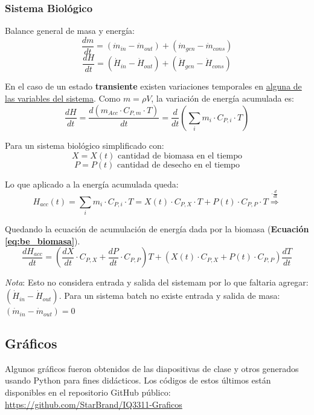         \subsubsection{Sistema Biológico}
        
        Balance general de masa y energía:
        \[\frac{dm}{dt} = \left ( \dot{m}_{in} - \dot{m}_{out} \right ) + \left ( \dot{m}_{gen} - \dot{m}_{cons} \right )\]
        \[\frac{dH}{dt} = \left ( \dot{H}_{in} - \dot{H}_{out} \right ) + \left ( \dot{H}_{gen} - \dot{H}_{cons} \right )\]
        
        En el caso de un estado \textbf{transiente} existen variaciones temporales en \underline{alguna de las variables del sistema}. Como \(m = \rho V\), la variación de energía acumulada es:
        \[\frac{dH}{dt} = \frac{d \left ( m_{Acc} \cdot C_{P, m} \cdot T \right )}{dt} = \frac{d}{dt} \left ( \sum_{i} m_{i} \cdot C_{P,i} \cdot T \right )\]
        
        Para un sistema biológico simplificado con:
        \[X = X(t) \text{ cantidad de biomasa en el tiempo}\]
        \[P = P(t) \text{ cantidad de desecho en el tiempo}\]
        
        Lo que aplicado a la energía acumulada queda:
        \[H_{acc}(t) = \sum_{i} m_{i} \cdot C_{P,i} \cdot T = X(t) \cdot C_{P, X} \cdot T + P(t) \cdot C_{P, P} \cdot T \overset{\cdot \frac{d}{dt}}{\Rightarrow}\]
        
        Quedando la ecuación de acumulación de energía dada por la biomasa (\textbf{Ecuación \ref{eq:be_biomasa}}).
        \begin{equation}
        \label{eq:be_biomasa}
            \frac{dH_{acc}}{dt} = \left ( \frac{dX}{dt} \cdot C_{P, X} + \frac{dP}{dt} \cdot C_{P, P} \right ) T + \left ( X(t) \cdot C_{P, X} + P(t) \cdot C_{P, P} \right ) \frac{dT}{dt}
        \end{equation}
        
        \textit{Nota}: Esto no considera entrada y salida del sistemam por lo que faltaria agregar: \(\left ( \dot{H}_{in} - \dot{H}_{out} \right )\). Para un sistema batch no existe entrada y salida de masa: \(\left ( \dot{m}_{in} - \dot{m}_{out} \right ) = 0\)

\begin{anexo}

    \section{Gráficos}
    
    Algunos gráficos fueron obtenidos de las diapositivas de clase \cite{martinez_basterrechea_iq3311_2021} y otros generados usando Python para fines didácticos. Los códigos de estos últimos están disponibles en el repositorio GitHub público: \url{https://github.com/StarBrand/IQ3311-Graficos}
    
    
    
\end{anexo}
